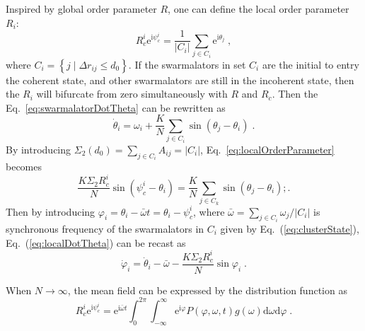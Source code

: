 \documentclass{article}
\begin{document}
Inspired by global order parameter $R$, one can define the local order parameter $R_i$:
\begin{equation}
    \label{eq:localOrderParameter}
    R_{c}^{i}\mathrm{e}^{\mathrm{i}\psi _{c}^{i}}=\frac{1}{\left| C_i \right|}\sum_{j\in C_i}{\mathrm{e}^{\mathrm{i}\theta _j}}\;,
\end{equation}
where $C_i=\left\{ j\mid \Delta r_{ij}\le d_0 \right\}$. If the swarmalators in set $C_i$ are the initial to entry the coherent state, and other swarmalators are still in the incoherent state, then the $R_i$ will bifurcate from zero simultaneously with $R$ and $R_c$. Then the Eq.~\eqref{eq:swarmalatorDotTheta} can be rewritten as
\begin{equation}
    \label{eq:localDotTheta}
    \dot{\theta}_i=\omega _i+\frac{K}{N} \sum_{j\in C_i}{\sin \left( \theta _j-\theta _i \right)}\;.
\end{equation}
By introducing $\Sigma _2\left( d_0 \right) =\sum\nolimits_{j\in C_i}^{}{A_{ij}}=\left|C_i\right|$, Eq.~\eqref{eq:localOrderParameter} becomes 
\begin{equation}
    \frac{K\Sigma _2R_{c}^{i}}{N} \sin \left( \psi _{c}^{i}-\theta _i \right) =\frac{K}{N} \sum_{j\in C_k}{\sin \left( \theta _j-\theta _i \right)}
;.
\end{equation}
Then by introducing $\varphi _i=\theta _i-\bar{\omega}t=\theta_i-\psi _{c}^{i}$, where $\bar{\omega}=\sum_{j\in C_i}{\omega _j}/\left| C_i \right|$ is synchronous frequency of the swarmalators in $C_i$ given by Eq.~(\ref{eq:clusterState}), Eq.~(\ref{eq:localDotTheta}) can be recast as
\begin{equation}
    \label{eq:dotphi}
    \dot{\varphi}_i=\dot{\theta}_i-\bar{\omega}-\frac{K\Sigma _2R_{c}^{i}}{N} \sin \varphi _i\;.
\end{equation}

When $N\rightarrow \infty$, the mean field can be expressed by the distribution function as
\begin{equation}
    R_{c}^{i}\mathrm{e}^{\mathrm{i}\psi _{c}^{i}}=\mathrm{e}^{\mathrm{i}\bar{\omega}t}\int_0^{2\pi}{\int_{-\infty}^{\infty}{\mathrm{e}^{\mathrm{i}\varphi}}}P(\varphi ,\omega ,t)g(\omega )\mathrm{d}\omega \mathrm{d}\varphi\;.
\end{equation}





\end{document}
